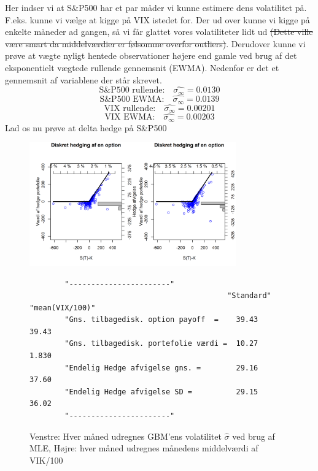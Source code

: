 \documentclass{article}
\theoremstyle{definition}
\theoremstyle{remark}
\begin{document}
Her indser vi at S\&P500 har et par måder vi kunne estimere dens volatilitet på. F.eks. kunne vi vælge at kigge på VIX istedet for. Der ud over kunne vi kigge på enkelte måneder ad gangen, så vi får glattet vores volatiliteter lidt ud \color{red}\sout{(Dette ville være smart da middelværdier er følsomme overfor outliers)}\color{black}. Derudover kunne vi prøve at vægte nyligt hentede observationer højere end gamle ved brug af det eksponentielt vægtede rullende gennemsnit (EWMA)\color{red}. Nedenfor er det et gennemsnit af variablene der står skrevet.\color{black}
$$\text{S\&P500 rullende:}\quad\hat{\sigma_{\infty}}=0.0130$$
$$\text{S\&P500 EWMA:}\quad\hat{\sigma_{\infty}}=0.0139$$
$$\text{VIX rullende:}\quad\hat{\sigma_{\infty}}=0.00201$$
$$\text{VIX EWMA:}\quad\hat{\sigma_{\infty}}=0.00203$$
Lad os nu prøve at delta hedge på S\&P500
\begin{figure}
    \centering
    \includegraphics[width=3.5in]{Overleaf/option_call_monthlyGBM_meanVIX100}
    \caption{Venstre: Hver måned udregnes GBM'ens volatilitet $\hat\sigma$ \color{red}ved brug af MLE\color{black}, Højre: hver måned udregnes månedens middelværdi af VIK/100}
    \begin{verbatim}
        "-----------------------"                         
                                             "Standard"   "mean(VIX/100)"
        "Gns. tilbagedisk. option payoff  =    39.43          39.43
        "Gns. tilbagedisk. portefolie værdi =  10.27          1.830
        "Endelig Hedge afvigelse gns. =        29.16          37.60
        "Endelig Hedge afvigelse SD =          29.15          36.02
        "-----------------------"
    \end{verbatim}
    \label{fig:standard}
\end{figure}
\end{document}
